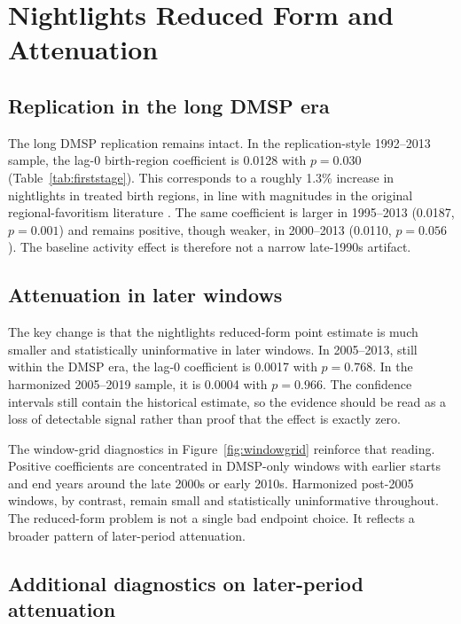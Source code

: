 \documentclass[9pt,twocolumn,twoside]{pnas-new}
\begin{document}
\section{Nightlights Reduced Form and Attenuation}

\subsection*{Replication in the long DMSP era}

The long DMSP replication remains intact. In the replication-style 1992--2013 sample, the lag-0 birth-region coefficient is 0.0128 with $p = 0.030$ (Table~\ref{tab:firststage}). This corresponds to a roughly 1.3\% increase in nightlights in treated birth regions, in line with magnitudes in the original regional-favoritism literature \cite{HodlerRaschky2014, DeLuca2018}. The same coefficient is larger in 1995--2013 (0.0187, $p = 0.001$) and remains positive, though weaker, in 2000--2013 (0.0110, $p = 0.056$). The baseline activity effect is therefore not a narrow late-1990s artifact.

\subsection*{Attenuation in later windows}

The key change is that the nightlights reduced-form point estimate is much smaller and statistically uninformative in later windows. In 2005--2013, still within the DMSP era, the lag-0 coefficient is 0.0017 with $p = 0.768$. In the harmonized 2005--2019 sample, it is 0.0004 with $p = 0.966$. The confidence intervals still contain the historical estimate, so the evidence should be read as a loss of detectable signal rather than proof that the effect is exactly zero.

The window-grid diagnostics in Figure~\ref{fig:windowgrid} reinforce that reading. Positive coefficients are concentrated in DMSP-only windows with earlier starts and end years around the late 2000s or early 2010s. Harmonized post-2005 windows, by contrast, remain small and statistically uninformative throughout. The reduced-form problem is not a single bad endpoint choice. It reflects a broader pattern of later-period attenuation.

\subsection*{Additional diagnostics on later-period attenuation}
\end{document}

